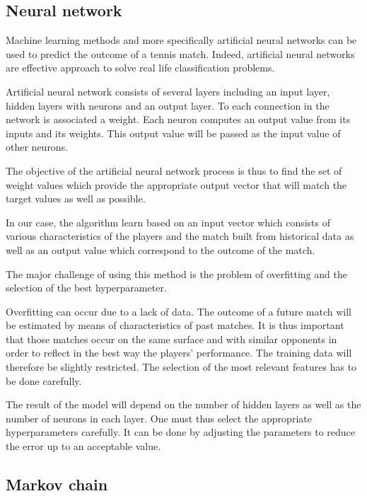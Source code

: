 \documentclass[a4paper,9pt]{report}
\theoremstyle{mytheor}
\begin{document}
\subsection{Neural network}
Machine learning methods and more specifically artificial neural networks can be used to predict the outcome of a tennis match. Indeed, artificial neural networks are effective approach to solve real life classification problems.

Artificial neural network consists of several layers including an input layer, hidden layers with neurons and an output layer. To each connection in the network is associated a weight. Each neuron computes an output value from its inputs and its weights. This output value will be passed as the input value of other neurons.

The objective of the artificial neural network process is thus to find the set of weight values which provide  the appropriate output vector that will match the target values as well as possible.

In our case, the algorithm learn based on an input vector which consists of various characteristics of the players and the match built from historical data as well as an output value which correspond to the outcome of the match.

The major challenge of using this method is the problem of overfitting and the selection of the best hyperparameter.

Overfitting can occur due to a lack of data. The outcome of a future match will be estimated by means of characteristics of past matches. It is thus important that those matches occur on the same surface and with similar opponents in order to reflect in the best way the players’ performance. The training data will therefore be slightly restricted. The selection of the most relevant features has to be done carefully.

The result of the model will depend on the number of hidden layers as well as the number of neurons in each layer. One must thus select the appropriate hyperparameters carefully.  It can be done by adjusting the parameters to reduce the error up to an acceptable value.

\subsection{Markov chain}
\end{document}
